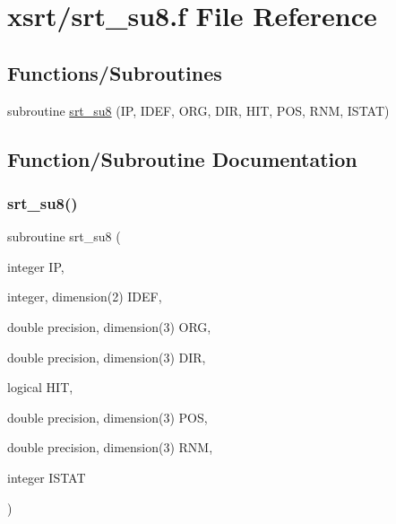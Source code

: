 \hypertarget{srt__su8_8f}{}\section{xsrt/srt\+\_\+su8.f File Reference}
\label{srt__su8_8f}
\subsection*{Functions/\+Subroutines}
\begin{DoxyCompactItemize}
\item 
subroutine \hyperlink{srt__su8_8f_a98529f9b5ac7868eea2454c0d0e2e5cf}{srt\+\_\+su8} (IP, I\+D\+EF, O\+RG, D\+IR, H\+IT, P\+OS, R\+NM, I\+S\+T\+AT)
\end{DoxyCompactItemize}


\subsection{Function/\+Subroutine Documentation}
\mbox{\label{srt__su8_8f_a98529f9b5ac7868eea2454c0d0e2e5cf}} 
\subsubsection{\texorpdfstring{srt\+\_\+su8()}{srt\_su8()}}
{\footnotesize\ttfamily subroutine srt\+\_\+su8 (\begin{DoxyParamCaption}\item[{integer}]{IP,  }\item[{integer, dimension(2)}]{I\+D\+EF,  }\item[{double precision, dimension(3)}]{O\+RG,  }\item[{double precision, dimension(3)}]{D\+IR,  }\item[{logical}]{H\+IT,  }\item[{double precision, dimension(3)}]{P\+OS,  }\item[{double precision, dimension(3)}]{R\+NM,  }\item[{integer}]{I\+S\+T\+AT }\end{DoxyParamCaption})}

